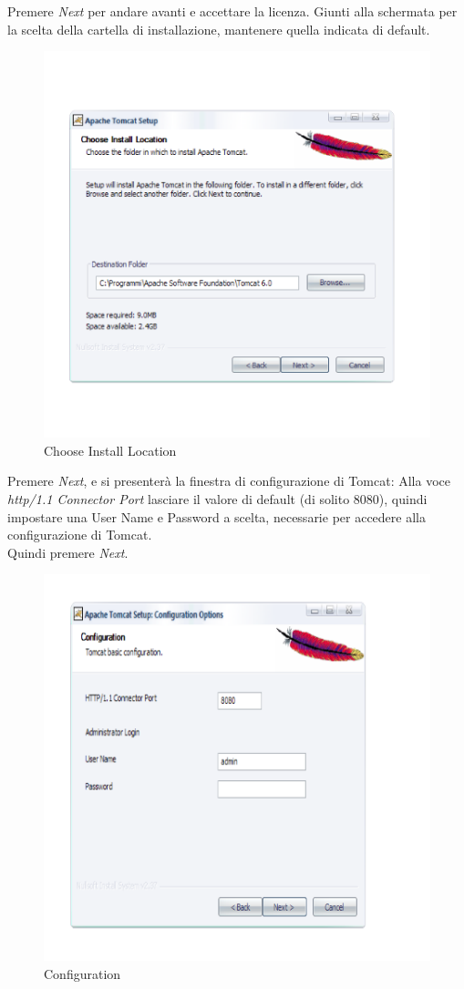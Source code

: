 Premere \textit{Next} per andare avanti e accettare la licenza.
Giunti alla schermata per la scelta della cartella di installazione, mantenere quella indicata di default.
 
\begin{figure}[!ht]
\centering
\includegraphics[scale=0.7]{images/InstallTomcat2.png}
\caption{Choose Install Location}
\end{figure}
\newpage
 
Premere \textit{Next}, e si presenter\`a la finestra di configurazione di Tomcat:
Alla voce \textit{http/1.1 Connector Port} lasciare il valore di default (di solito 8080), quindi impostare una User Name e Password a scelta, necessarie per accedere alla configurazione di Tomcat.\\
Quindi premere \textit{Next}.

\begin{figure}[!ht]
\centering
\includegraphics[scale=0.7]{images/InstallTomcat3.png}
\caption{Configuration}
\end{figure} 

